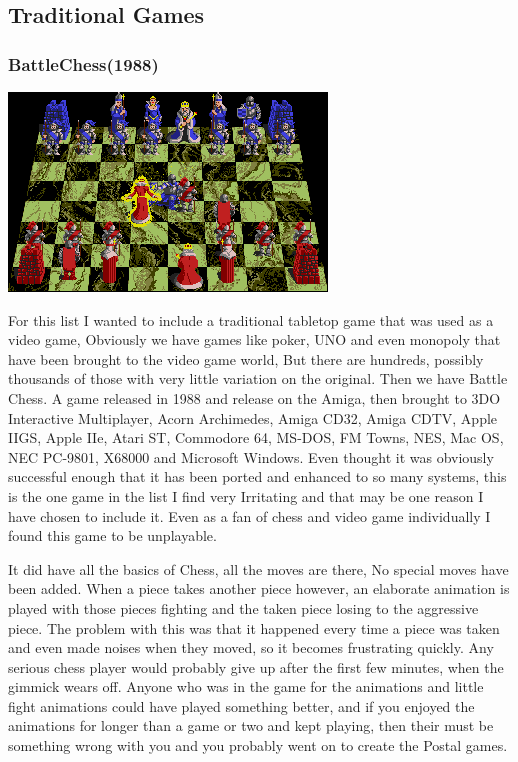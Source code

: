 \documentclass{article}
\begin{document}
\subsection{Traditional Games}
\subsubsection{BattleChess(1988)}
\begin{minipage}{0.43\textwidth}
\includegraphics[width=\linewidth]{battlechess}
\end{minipage} \hfill
\begin{minipage}{0.55\textwidth}\raggedright
For this list I wanted to include a traditional tabletop game that was used as a video game, Obviously we have games like poker, UNO and even monopoly that have been brought to the video game world, But there are hundreds, possibly thousands of those with very little variation on the original. Then we have Battle Chess. A game released in 1988 and release on the Amiga, then brought to  3DO Interactive Multiplayer, Acorn Archimedes, Amiga CD32, Amiga CDTV, Apple IIGS, Apple IIe, Atari ST, Commodore 64, MS-DOS, FM Towns, NES, Mac OS, NEC PC-9801, X68000 and Microsoft Windows. Even thought it was obviously successful enough that it has been ported and enhanced to so many systems, this is the one game in the list I find very Irritating and that may be one reason I have chosen to include it. Even as a fan of chess and video game individually I found this game to be unplayable.
\end{minipage} \newline
It did have all the basics of Chess, all the moves are there, No special moves have been added. When a piece takes another piece however, an elaborate animation is played with those pieces fighting and the taken piece losing to the aggressive piece. The problem with this was that it happened every time a piece was taken and even made noises when they moved, so it becomes frustrating quickly. Any serious chess player would probably give up after the first few minutes, when the gimmick wears off. Anyone who was in the game for the animations and little fight animations could have played something better, and if you enjoyed the animations for longer than a game or two and kept playing, then their  must be something wrong with you and you probably went on to create the Postal games. \newline
\end{document}
